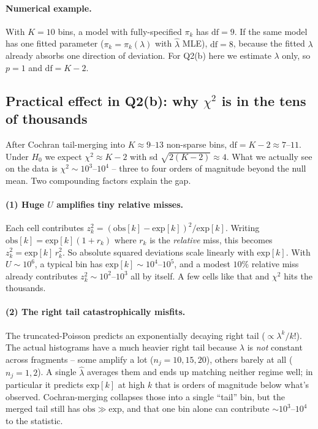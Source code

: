 \documentclass[11pt]{article}
\newcommand{\obs}{\mathrm{obs}}
\newcommand{\expc}{\mathrm{exp}}
\begin{document}
\paragraph{Numerical example.}
With $K = 10$ bins, a model with fully-specified $\pi_k$ has
$\mathrm{df} = 9$. If the same model has one fitted parameter
($\pi_k = \pi_k(\lambda)$ with $\hat\lambda$ MLE), $\mathrm{df} = 8$,
because the fitted $\lambda$ already absorbs one direction of deviation.
For Q2(b) here we estimate $\lambda$ only, so $p = 1$ and $\mathrm{df} = K - 2$.

\subsection{Practical effect in Q2(b): why $\chi^{2}$ is in the tens of thousands}

After Cochran tail-merging into $K \approx 9$--$13$ non-sparse bins,
$\mathrm{df} = K - 2 \approx 7$--$11$. Under $H_0$ we expect
$\chi^{2} \approx K-2$ with sd $\sqrt{2(K-2)} \approx 4$. What we actually
see on the data is $\chi^{2} \sim 10^{3}$--$10^{4}$ -- three to four orders
of magnitude beyond the null mean. Two compounding factors explain the gap.

\paragraph{(1) Huge $U$ amplifies tiny relative misses.}
Each cell contributes
$z_k^2 = (\obs[k]-\expc[k])^{2}/\expc[k]$. Writing
$\obs[k] = \expc[k](1 + r_k)$ where $r_k$ is the \emph{relative}
miss, this becomes $z_k^2 = \expc[k]\,r_k^2$. So absolute squared deviations
scale linearly with $\expc[k]$. With $U \sim 10^{6}$, a typical bin has
$\expc[k] \sim 10^{4}$--$10^{5}$, and a modest $10\%$ relative miss already
contributes $z_k^2 \sim 10^{2}$--$10^{3}$ all by itself. A few cells like
that and $\chi^{2}$ hits the thousands.

\paragraph{(2) The right tail catastrophically misfits.}
The truncated-Poisson predicts an exponentially decaying right tail
($\propto \lambda^{k}/k!$). The actual histograms have a much heavier right
tail because $\lambda$ is \emph{not} constant across fragments -- some
amplify a lot ($n_j = 10, 15, 20$), others barely at all ($n_j = 1, 2$).
A single $\hat\lambda$ averages them and ends up matching neither regime
well; in particular it predicts $\expc[k]$ at high $k$ that is orders of
magnitude below what's observed. Cochran-merging collapses those into a
single ``tail'' bin, but the merged tail still has $\obs \gg \expc$, and
that one bin alone can contribute $\sim 10^{3}$--$10^{4}$ to the statistic.
\end{document}

